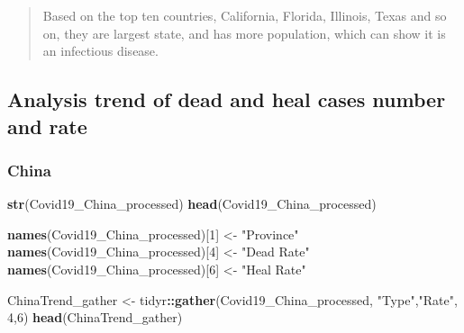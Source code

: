 \documentclass[12pt,]{article}
\newenvironment{Shaded}{\begin{snugshade}}{\end{snugshade}}
\newcommand{\DecValTok}[1]{\textcolor[rgb]{0.00,0.00,0.81}{#1}}
\newcommand{\KeywordTok}[1]{\textcolor[rgb]{0.13,0.29,0.53}{\textbf{#1}}}
\newcommand{\NormalTok}[1]{#1}
\newcommand{\OperatorTok}[1]{\textcolor[rgb]{0.81,0.36,0.00}{\textbf{#1}}}
\newcommand{\StringTok}[1]{\textcolor[rgb]{0.31,0.60,0.02}{#1}}
\begin{document}
\begin{quote}
Based on the top ten countries, California, Florida, Illinois, Texas and
so on, they are largest state, and has more population, which can show
it is an infectious disease.
\end{quote}

\hypertarget{analysis-trend-of-dead-and-heal-cases-number-and-rate}{%
\subsection{Analysis trend of dead and heal cases number and
rate}\label{analysis-trend-of-dead-and-heal-cases-number-and-rate}}

\hypertarget{china}{%
\subsubsection{China}\label{china}}

\begin{Shaded}
\begin{Highlighting}[]
\KeywordTok{str}\NormalTok{(Covid19_China_processed)}
\KeywordTok{head}\NormalTok{(Covid19_China_processed)}

\KeywordTok{names}\NormalTok{(Covid19_China_processed)[}\DecValTok{1}\NormalTok{] <-}\StringTok{ "Province"}
\KeywordTok{names}\NormalTok{(Covid19_China_processed)[}\DecValTok{4}\NormalTok{] <-}\StringTok{ "Dead Rate"}
\KeywordTok{names}\NormalTok{(Covid19_China_processed)[}\DecValTok{6}\NormalTok{] <-}\StringTok{ "Heal Rate"}

\NormalTok{ChinaTrend_gather <-}\StringTok{ }\NormalTok{tidyr}\OperatorTok{::}\KeywordTok{gather}\NormalTok{(Covid19_China_processed, }\StringTok{"Type"}\NormalTok{,}\StringTok{"Rate"}\NormalTok{, }\DecValTok{4}\NormalTok{,}\DecValTok{6}\NormalTok{)}
\KeywordTok{head}\NormalTok{(ChinaTrend_gather)}
\end{Highlighting}
\end{Shaded}
\end{document}
